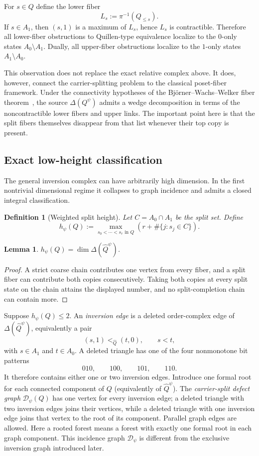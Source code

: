 \documentclass[11pt]{article}
\newtheorem{lemma}[theorem]{Lemma}
\newtheorem{definition}[theorem]{Definition}
\begin{document}
For $s\in Q$ define the lower fiber
\[
 L_s:=\pi^{-1}(Q_{\leq s}).
\]
If $s\in A_1$, then $(s,1)$ is a maximum of $L_s$, hence $L_s$ is
contractible.  Therefore all lower-fiber obstructions to Quillen-type equivalence
localize to the $0$-only states $A_0\setminus A_1$.  Dually, all upper-fiber
obstructions localize to the $1$-only states $A_1\setminus A_0$.

This observation does not replace the exact relative complex above.  It does,
however, connect the carrier-splitting problem to the classical poset-fiber
framework.  Under the connectivity hypotheses of the Bj\"orner--Wachs--Welker
fiber theorem~\cite{BjornerWachsWelker2005}, the source $\Delta(Q^\psi)$ admits a wedge decomposition in terms
of the noncontractible lower fibers and upper links.  The important point here is
that the split fibers themselves disappear from that list whenever their top copy
is present.

\subsection{Exact low-height classification}

The general inversion complex can have arbitrarily high dimension.  In the first
nontrivial dimensional regime it collapses to graph incidence and admits a closed
integral classification.

\begin{definition}[Weighted split height]
Let $C=A_0\cap A_1$ be the split set.  Define
\[
 h_\psi(Q)
 :=\max_{s_0<\cdots<s_r\text{ in }Q}
 \left(r+\#\{j:s_j\in C\}\right).
\]
\end{definition}

\begin{lemma}\label{lem:split-height}
$h_\psi(Q)=\dim\Delta(\widehat Q^\psi)$.
\end{lemma}
\begin{proof}
A strict coarse chain contributes one vertex from every fiber, and a split fiber can
contribute both copies consecutively.  Taking both copies at every split state on the
chain attains the displayed number, and no split-completion chain can contain more.
\end{proof}

Suppose $h_\psi(Q)\leq2$.  An \emph{inversion edge} is a deleted order-complex edge
of $\Delta(\widehat Q^\psi)$, equivalently a pair
\[
 (s,1)<_{\widehat Q}(t,0),\qquad s<t,
\]
with $s\in A_1$ and $t\in A_0$.  A deleted triangle has one of the four nonmonotone
bit patterns
\[
 010,\qquad100,\qquad101,\qquad110.
\]
It therefore contains either one or two inversion edges.  Introduce one formal root
for each connected component of $Q$ (equivalently of $\widehat Q^\psi$).  The
\emph{carrier-split defect graph} $\mathcal D_\psi(Q)$ has one vertex for every inversion edge;
a deleted triangle with two inversion edges joins their vertices, while a deleted
triangle with one inversion edge joins that vertex to the root of its component.
Parallel graph edges are allowed.  Here a rooted forest means a forest
with exactly one formal root in each graph component.  This incidence graph
$\mathcal D_\psi$ is different from the exclusive inversion graph introduced later.
\end{document}
